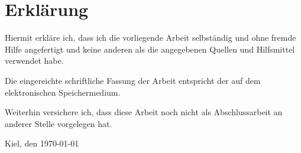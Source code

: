 
\contentspacing

\chapter*{Erklärung}
\label{sec:Erklaerung}

Hiermit erkläre ich,
dass ich die vorliegende Arbeit selbständig und ohne fremde Hilfe angefertigt und keine anderen als die angegebenen Quellen und Hilfsmittel verwendet habe.

\vspace{0.5cm}
\noindent Die eingereichte schriftliche Fassung der Arbeit entspricht der auf dem elektronischen Speichermedium.

\vspace{0.5cm}
\noindent Weiterhin versichere ich, dass diese Arbeit noch nicht als Abschlussarbeit an anderer Stelle vorgelegen hat.




\vspace{30mm}
Kiel, den \today
\vspace{5mm}

\raggedleft \bitAuthor

